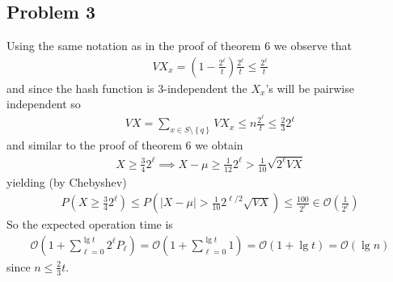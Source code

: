 \subsection*{Problem 3}
Using the same notation as in the proof of theorem 6 we observe that
\begin{align*}
	VX_x=\left( 1-\frac{2^{\ell}}{t} \right)\frac{2^{\ell}}{t} \leq \frac{2^{\ell}}{t}
\end{align*}
and since the hash function is 3-independent the $X_x$'s will be pairwise independent so
\begin{align*}
	VX=\sum_{x \in S \setminus \left\{ q \right\}}^{}VX_x \leq n \frac{2^{\ell}}{t} \leq \frac{2}{3}2^{\ell}
\end{align*}
and similar to the proof of theorem 6 we obtain
\begin{align*}
	X \geq \frac{3}{4}2^{\ell} \implies X-\mu \geq \frac{1}{12}2^{\ell} > \frac{1}{10} \sqrt{2^{\ell} VX}
\end{align*}
yielding (by Chebyshev)
\begin{align*}
	P\left( X \geq \frac{3}{4}2^{\ell} \right) \leq 
	P\left( |X-\mu| > \frac{1}{10}2^{\ell/2} \sqrt{VX} \right) \leq \frac{100}{2^{\ell}} \in \mathcal{O}\left( \frac{1}{2^{\ell}} \right)
\end{align*}
So the expected operation time is
\begin{align*}
	\mathcal{O}\left( 1+\sum_{\ell=0}^{\lg t}2^{\ell}P_{\ell} \right)= 
	\mathcal{O}\left( 1+\sum_{\ell=0}^{\lg t} 1 \right) =
	\mathcal{O} \left( 1+ \lg t \right)= \mathcal{O}\left( \lg n \right)
\end{align*}
since $n \leq \frac{2}{3}t$.
